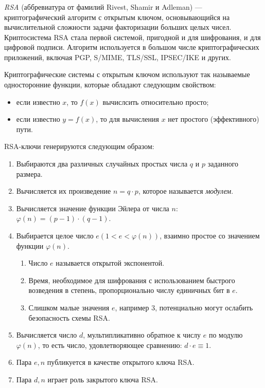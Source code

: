 \subsubsection{}
\label{sec:analysis:research:crypto:rsa}

\emph{RSA} (аббревиатура от фамилий Rivest, Shamir и Adleman) — криптографический алгоритм с открытым ключом, основывающийся на вычислительной сложности задачи факторизации больших целых чисел. Криптосистема RSA стала первой системой, пригодной и для шифрования, и для цифровой подписи. Алгоритм используется в большом числе криптографических приложений, включая PGP, S/MIME, TLS/SSL, IPSEC/IKE и других\cite{wiki:rsa}.

Криптографические системы с открытым ключом используют так называемые односторонние функции, которые обладают следующим свойством:
\begin{itemize}
	\item если известно \(x\), то \(f(x)\) вычислсить относительно просто;
	\item если известно \(y=f(x)\), то для вычисления \(x\) нет простого (эффективного) пути.
\end{itemize}

RSA-ключи генерируются следующим образом:
\begin{enumerate}
	\item Выбираются два различных случайных простых числа \(q\) и \(p\) заданного размера.
	\item Вычисляется их произведение \(n=q \cdot p\), которое называется \emph{модулем}.
	\item Вычисляется значение функции Эйлера от числа \(n\): \(\varphi(n)=(p-1) \cdot (q-1)\).
	\item Выбирается целое число \(e (1 < e < \varphi(n))\), взаимно простое со значением функции \(\varphi(n)\).
	\begin{enumerate}
		\item Число \(e\) называется открытой экспонентой.
		\item Время, необходимое для шифрования с использованием быстрого возведения в степень, пропорционально числу единичных бит в \(e\).
		\item Слишком малые значения \(e\), например 3, потенциально могут ослабить безопасность схемы RSA.
	\end{enumerate}
	\item Вычисляется число \(d\), мультипликативно обратное к числу \(e\) по модулю  \(\varphi(n)\), то есть число, удовлетворяющее сравнению: \(d \cdot e \equiv 1\).
	\item Пара \({e,n}\) публикуется в качестве открытого ключа RSA.
	\item Пара \({d,n}\)  играет роль закрытого ключа RSA.
\end{enumerate}


